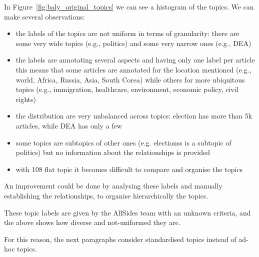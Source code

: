 In Figure~\ref{fig:baly_original_topics} we can see a histogram of the topics. We can make several observations:

\begin{itemize}
    \item the labels of the topics are not uniform in terms of granularity: there are some very wide topics (e.g., politics) and some very narrow ones (e.g., DEA)
    \item the labels are annotating several aspects and having only one label per article this means that some articles are annotated for the location mentioned (e.g., world, Africa, Russia, Asia, South Corea) while others for more ubiquitous topics (e.g., immigration, healthcare, environment, economic policy, civil rights) %
    \item the distribution are very unbalanced across topics: election has more than 5k articles, while DEA has only a few
    \item some topics are subtopics of other ones (e.g. electionss is a subtopic of politics) but no information about the relationships is provided
    \item with 108 flat topic it becomes difficult to compare and organise the topics
\end{itemize}

An improvement could be done by analysing these labels and manually establishing the relationships, to organise hierarchically the topics.




These topic labels are given by the AllSides team with an unknown criteria, and the above shows how diverse and not-uniformed they are.

For this reason, the next paragraphs consider standardised topics instead of ad-hoc topics.


